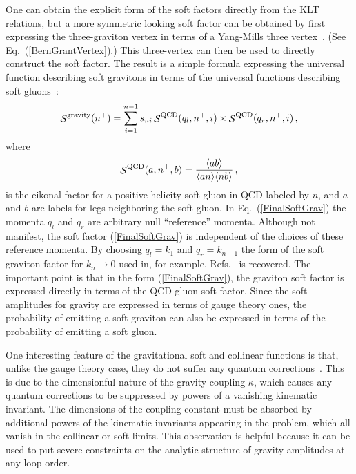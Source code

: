 \documentclass[12pt]{livrev}
\begin{document}
One can obtain the explicit form of the soft factors directly from
the KLT relations, but a more symmetric looking soft factor can be
obtained by first expressing the three-graviton vertex in terms of a
Yang-Mills three vertex~\cite{BernGrant}.  (See
Eq.~(\ref{BernGrantVertex}).) This three-vertex can then be used to 
directly construct the soft factor.  The result is a simple formula
expressing the universal function describing soft gravitons in terms of
the universal functions describing soft gluons~\cite{BernGrant}:
\begin{equation}
{\mathop {\cal S} \nolimits}^{\rm gravity}(n^+) = \sum_{i=1}^{n-1} s_{ni} \,
          {\mathop {\cal S} \nolimits}^{\rm QCD}(q_l, n^+, i) \times 
          {\mathop {\cal S} \nolimits}^{\rm QCD}(q_r, n^+, i) \,,
\label{FinalSoftGrav}
\end{equation}
%
where
%
\begin{equation}
{\mathop {\cal S} \nolimits}^{\rm QCD}(a, n^+, b) 
= {\langle {a}{b}\rangle \over 
     \langle{a}{n}\rangle \langle{n}{b}\rangle}\,,
\end{equation}
%
is the eikonal factor for a positive helicity soft gluon in QCD
labeled by $n$, and $a$ and $b$ are labels for legs neighboring the
soft gluon.  In Eq.~(\ref{FinalSoftGrav}) the momenta $q_l$ and $q_r$
are arbitrary null ``reference'' momenta.  Although not manifest, the
soft factor (\ref{FinalSoftGrav}) is independent of the choices of
these reference momenta.  By choosing $q_l = k_1$ and $q_r = k_{n-1}$
the form of the soft graviton factor for $k_n \rightarrow 0$ used in,
for example, Refs.~\cite{BGK,AllPlusGrav,MHVGrav} is recovered.  The
important point is that in the form (\ref{FinalSoftGrav}), the
graviton soft factor is expressed directly in terms of the QCD gluon
soft factor.  Since the soft amplitudes for gravity are expressed in
terms of gauge theory ones, the probability of emitting a soft
graviton can also be expressed in terms of the probability of emitting
a soft gluon.

One interesting feature of the gravitational soft and collinear
functions is that, unlike the gauge theory case, they do not suffer
any quantum corrections~\cite{MHVGrav}.  This is due to the
dimensionful nature of the gravity coupling $\kappa$, which causes any
quantum corrections to be suppressed by powers of a vanishing
kinematic invariant. The dimensions of the coupling constant must be
absorbed by additional powers of the kinematic invariants appearing in
the problem, which all vanish in the collinear or soft limits.  This
observation is helpful because it can be used to put severe
constraints on the analytic structure of gravity amplitudes at any
loop order.
\end{document}
